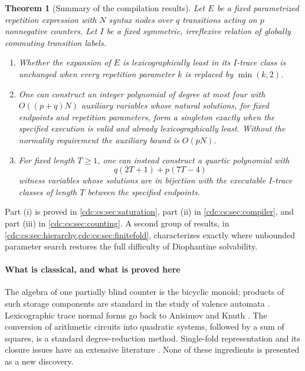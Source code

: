\documentclass[11pt,a4paper]{article}
\newtheorem{theorem}{Theorem}[section]
\theoremstyle{definition}
\theoremstyle{remark}
\begin{document}
\begin{theorem}[Summary of the compilation results]
\label{cdc:cs:thm:overview}
Let $E$ be a fixed parametrized repetition expression with $N$ syntax nodes
over $q$ transitions acting on $p$ nonnegative counters. Let $I$ be a fixed
symmetric, irreflexive relation of globally commuting transition labels.
\begin{enumerate}[label=\textnormal{(\roman*)},leftmargin=2em]
\item Whether the expansion of $E$ is lexicographically least in its $I$-trace
class is unchanged when every repetition parameter $k$ is replaced by
$\min(k,2)$.
\item One can construct an integer polynomial of degree at most four with
$O((p+q)N)$ auxiliary variables whose natural solutions, for fixed endpoints
and repetition parameters, form a singleton exactly when the specified
execution is valid and already lexicographically least. Without the normality
requirement the auxiliary bound is $O(pN)$.
\item For fixed length $T\geq 1$, one can instead construct a quartic
polynomial with
\[
q(2T+1)+p(7T-4)
\]
witness variables whose solutions are in bijection with the executable
$I$-trace classes of length $T$ between the specified endpoints.
\end{enumerate}
\end{theorem}

Part (i) is proved in \cref{cdc:cs:sec:saturation}, part (ii) in
\cref{cdc:cs:sec:compiler}, and part (iii) in \cref{cdc:cs:sec:counting}. A second group of
results, in \cref{cdc:cs:sec:hierarchy,cdc:cs:sec:finitefold}, characterizes exactly where
unbounded parameter search restores the full difficulty of Diophantine
solvability.

\paragraph{What is classical, and what is proved here}

The algebra of one partially blind counter is the bicyclic monoid; products of
such storage components are standard in the study of valence automata
\cite{zetzsche}. Lexicographic trace normal forms go back to Anisimov and Knuth
\cite{anisimov-knuth}. The conversion of arithmetic circuits into quadratic
systems, followed by a sum of squares, is a standard degree-reduction method.
Single-fold representation and its closure issues have an extensive literature
\cite{mat2010,cco2024}. None of these ingredients is
presented as a new discovery.
\end{document}
